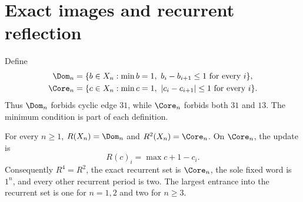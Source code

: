 \section{Exact images and recurrent reflection}
Define
\begin{align*}
 \Dom_n&=\{b\in X_n:\min b=1,\ b_i-b_{i+1}\le1\text{ for every }i\},\\
 \Core_n&=\{c\in X_n:\min c=1,\ |c_i-c_{i+1}|\le1\text{ for every }i\}.
\end{align*}
Thus $\Dom_n$ forbids cyclic edge $31$, while $\Core_n$ forbids both
$31$ and $13$. The minimum condition is part of each definition.

\begin{theorem}\label{thm:core}
For every $n\ge1$, $R(X_n)=\Dom_n$ and $R^2(X_n)=\Core_n$. On
$\Core_n$, the update is
\begin{equation}\label{eq:reflection}
 R(c)_i=\max c+1-c_i.
\end{equation}
Consequently $R^4=R^2$, the exact recurrent set is $\Core_n$, the sole
fixed word is $1^n$, and every other recurrent period is two. The largest
entrance into the recurrent set is one for $n=1,2$ and two for $n\ge3$.
\end{theorem}

